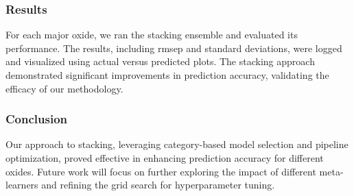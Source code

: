 \subsubsection{Results}

For each major oxide, we ran the stacking ensemble and evaluated its performance.
The results, including \gls{rmsep} and standard deviations, were logged and visualized using actual versus predicted plots.
The stacking approach demonstrated significant improvements in prediction accuracy, validating the efficacy of our methodology.


\subsubsection{Conclusion}

Our approach to stacking, leveraging category-based model selection and pipeline optimization, proved effective in enhancing prediction accuracy for different oxides.
Future work will focus on further exploring the impact of different meta-learners and refining the grid search for hyperparameter tuning.